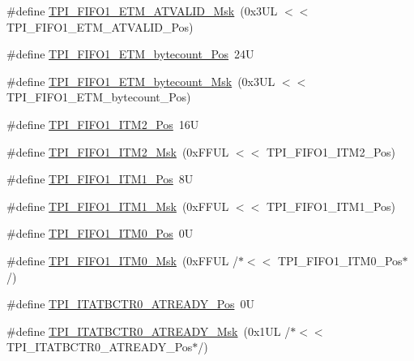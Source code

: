 \begin{DoxyCompactItemize}
\item 
\#define \hyperlink{group___c_m_s_i_s___t_p_i_ga0e8f29a1e9378d1ceb0708035edbb86d}{T\-P\-I\-\_\-\-F\-I\-F\-O1\-\_\-\-E\-T\-M\-\_\-\-A\-T\-V\-A\-L\-I\-D\-\_\-\-Msk}~(0x3\-U\-L $<$$<$ T\-P\-I\-\_\-\-F\-I\-F\-O1\-\_\-\-E\-T\-M\-\_\-\-A\-T\-V\-A\-L\-I\-D\-\_\-\-Pos)
\item 
\#define \hyperlink{group___c_m_s_i_s___t_p_i_gaab31238152b5691af633a7475eaf1f06}{T\-P\-I\-\_\-\-F\-I\-F\-O1\-\_\-\-E\-T\-M\-\_\-bytecount\-\_\-\-Pos}~24\-U
\item 
\#define \hyperlink{group___c_m_s_i_s___t_p_i_gab554305459953b80554fdb1908b73291}{T\-P\-I\-\_\-\-F\-I\-F\-O1\-\_\-\-E\-T\-M\-\_\-bytecount\-\_\-\-Msk}~(0x3\-U\-L $<$$<$ T\-P\-I\-\_\-\-F\-I\-F\-O1\-\_\-\-E\-T\-M\-\_\-bytecount\-\_\-\-Pos)
\item 
\#define \hyperlink{group___c_m_s_i_s___t_p_i_ga1828c228f3940005f48fb8dd88ada35b}{T\-P\-I\-\_\-\-F\-I\-F\-O1\-\_\-\-I\-T\-M2\-\_\-\-Pos}~16\-U
\item 
\#define \hyperlink{group___c_m_s_i_s___t_p_i_gae54512f926ebc00f2e056232aa21d335}{T\-P\-I\-\_\-\-F\-I\-F\-O1\-\_\-\-I\-T\-M2\-\_\-\-Msk}~(0x\-F\-F\-U\-L $<$$<$ T\-P\-I\-\_\-\-F\-I\-F\-O1\-\_\-\-I\-T\-M2\-\_\-\-Pos)
\item 
\#define \hyperlink{group___c_m_s_i_s___t_p_i_gaece86ab513bc3d0e0a9dbd82258af49f}{T\-P\-I\-\_\-\-F\-I\-F\-O1\-\_\-\-I\-T\-M1\-\_\-\-Pos}~8\-U
\item 
\#define \hyperlink{group___c_m_s_i_s___t_p_i_ga3347f42828920dfe56e3130ad319a9e6}{T\-P\-I\-\_\-\-F\-I\-F\-O1\-\_\-\-I\-T\-M1\-\_\-\-Msk}~(0x\-F\-F\-U\-L $<$$<$ T\-P\-I\-\_\-\-F\-I\-F\-O1\-\_\-\-I\-T\-M1\-\_\-\-Pos)
\item 
\#define \hyperlink{group___c_m_s_i_s___t_p_i_ga2188671488417a52abb075bcd4d73440}{T\-P\-I\-\_\-\-F\-I\-F\-O1\-\_\-\-I\-T\-M0\-\_\-\-Pos}~0\-U
\item 
\#define \hyperlink{group___c_m_s_i_s___t_p_i_ga8ae09f544fc1a428797e2a150f14a4c9}{T\-P\-I\-\_\-\-F\-I\-F\-O1\-\_\-\-I\-T\-M0\-\_\-\-Msk}~(0x\-F\-F\-U\-L /$\ast$$<$$<$ T\-P\-I\-\_\-\-F\-I\-F\-O1\-\_\-\-I\-T\-M0\-\_\-\-Pos$\ast$/)
\item 
\#define \hyperlink{group___c_m_s_i_s___t_p_i_gab1eb6866c65f02fa9c83696b49b0f346}{T\-P\-I\-\_\-\-I\-T\-A\-T\-B\-C\-T\-R0\-\_\-\-A\-T\-R\-E\-A\-D\-Y\-\_\-\-Pos}~0\-U
\item 
\#define \hyperlink{group___c_m_s_i_s___t_p_i_gaee320b3c60f9575aa96a8742c4ff9356}{T\-P\-I\-\_\-\-I\-T\-A\-T\-B\-C\-T\-R0\-\_\-\-A\-T\-R\-E\-A\-D\-Y\-\_\-\-Msk}~(0x1\-U\-L /$\ast$$<$$<$ T\-P\-I\-\_\-\-I\-T\-A\-T\-B\-C\-T\-R0\-\_\-\-A\-T\-R\-E\-A\-D\-Y\-\_\-\-Pos$\ast$/)

\end{DoxyCompactItemize}
